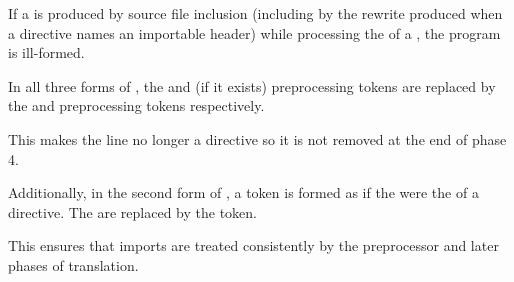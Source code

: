 \pnum
If a  is produced by source file inclusion
(including by the rewrite produced
when a  directive names an importable header)
while processing the  of a ,
the program is ill-formed.

\pnum
In all three forms of ,
the  and  (if it exists) preprocessing tokens
are replaced by the  and
 preprocessing tokens respectively.
\begin{note}
This makes the line no longer a directive
so it is not removed at the end of phase 4.
\end{note}
Additionally, in the second form of ,
a  token is formed as if
the 
were the  of a  directive.
The  are replaced by
the  token.
\begin{note}
This ensures that imports are treated consistently by
the preprocessor and later phases of translation.
\end{note}

